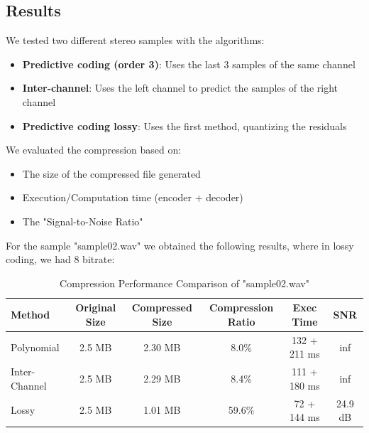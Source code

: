 \documentclass[a4paper,14pt]{article}
\begin{document}
\subsection{Results}
We tested two different stereo samples with the algorithms:
\begin{itemize}
    \item \textbf{Predictive coding (order 3)}: Uses the last 3 samples of the same channel
    \item \textbf{Inter-channel}: Uses the left channel to predict the samples of the right channel
    \item \textbf{Predictive coding lossy}: Uses the first method, quantizing the residuals    
\end{itemize}

We evaluated the compression based on:
    \begin{itemize}
        \item The size of the compressed file generated
        \item Execution/Computation time (encoder + decoder)
        \item The "Signal-to-Noise Ratio"
    \end{itemize}


For the sample "sample02.wav" we obtained the following results, where in lossy coding, we had 8 bitrate:

\begin{table}[H]
\centering
\begin{tabular}{|l|c|c|c|c|c|}
\hline
\textbf{Method} & \textbf{Original Size} & \textbf{Compressed Size} & \textbf{Compression Ratio} & \textbf{Exec Time} & \textbf{SNR}\\
\hline
Polynomial & 2.5 MB & 2.30 MB & 8.0\% & 132 + 211 ms & inf\\
Inter-Channel & 2.5 MB & 2.29 MB & 8.4\% & 111 + 180 ms & inf\\
Lossy & 2.5 MB & 1.01 MB & 59.6\% & 72 + 144 ms & 24.9 dB\\
\hline
\end{tabular}
\caption{Compression Performance Comparison of "sample02.wav"}
\end{table}
\end{document}
